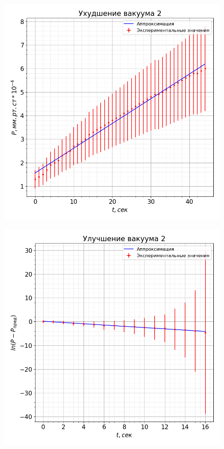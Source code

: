 \documentclass[a4paper, 12pt]{article}
\begin{document}
            \begin{figure}[ht]
                \centering
                \begin{minipage}{0.45\textwidth}
                    \centering
                    \includegraphics[width=1\linewidth]{rise2.png}
                    \label{rise2}
                \end{minipage}
                \begin{minipage}{0.45\textwidth}
                    \centering
                    \includegraphics[width=1\linewidth]{fall2.png}
                    \label{fall2}
                \end{minipage}
            \end{figure}
\end{document}
